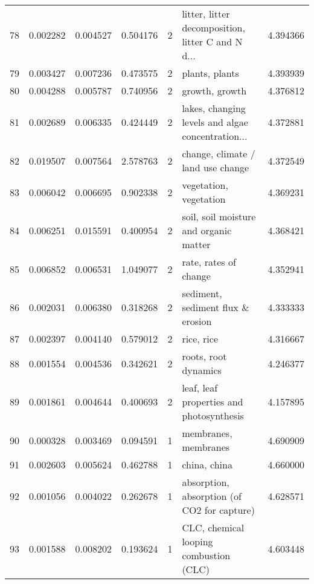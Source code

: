 \begin{tabular}{lrrrrlr}
78  &    0.002282 &  0.004527 &        0.504176 &           2 &  litter, litter decomposition, litter C and N d... &  4.394366 \\
79  &    0.003427 &  0.007236 &        0.473575 &           2 &                                     plants, plants &  4.393939 \\
80  &    0.004288 &  0.005787 &        0.740956 &           2 &                                     growth, growth &  4.376812 \\
81  &    0.002689 &  0.006335 &        0.424449 &           2 &  lakes, changing levels and algae concentration... &  4.372881 \\
82  &    0.019507 &  0.007564 &        2.578763 &           2 &                  change, climate / land use change &  4.372549 \\
83  &    0.006042 &  0.006695 &        0.902338 &           2 &                             vegetation, vegetation &  4.369231 \\
84  &    0.006251 &  0.015591 &        0.400954 &           2 &             soil, soil moisture and organic matter &  4.368421 \\
85  &    0.006852 &  0.006531 &        1.049077 &           2 &                              rate, rates of change &  4.352941 \\
86  &    0.002031 &  0.006380 &        0.318268 &           2 &                  sediment, sediment flux \& erosion &  4.333333 \\
87  &    0.002397 &  0.004140 &        0.579012 &           2 &                                         rice, rice &  4.316667 \\
88  &    0.001554 &  0.004536 &        0.342621 &           2 &                               roots, root dynamics &  4.246377 \\
89  &    0.001861 &  0.004644 &        0.400693 &           2 &           leaf, leaf properties and photosynthesis &  4.157895 \\
90  &    0.000328 &  0.003469 &        0.094591 &           1 &                               membranes, membranes &  4.690909 \\
91  &    0.002603 &  0.005624 &        0.462788 &           1 &                                       china, china &  4.660000 \\
92  &    0.001056 &  0.004022 &        0.262678 &           1 &        absorption, absorption (of CO2 for capture) &  4.628571 \\
93  &    0.001588 &  0.008202 &        0.193624 &           1 &             CLC, chemical looping combustion (CLC) &  4.603448 \\

\end{tabular}
